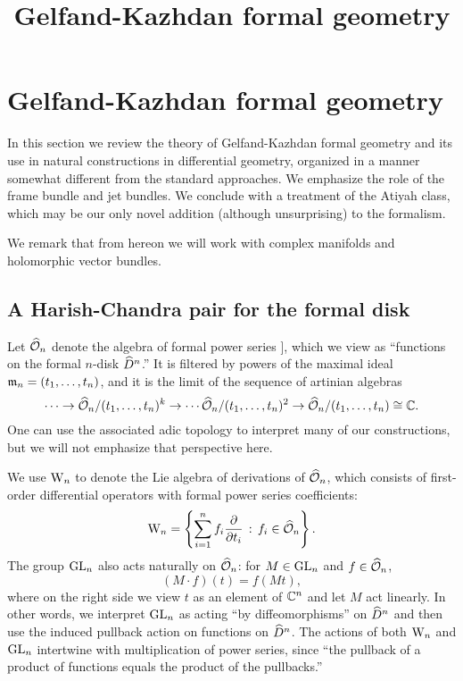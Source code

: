 \documentclass[10pt]{amsart}
\title{Gelfand-Kazhdan formal geometry}
\begin{document}
\maketitle

\section{Gelfand-Kazhdan formal geometry}

In this section we review the theory of Gelfand-Kazhdan formal geometry and its use in natural constructions in differential geometry,
organized in a manner somewhat different from the standard
approaches. We emphasize the role of the frame bundle and jet bundles.
We conclude with a treatment of the Atiyah class, which may be our only novel addition (although unsurprising) to the formalism.

We remark that from hereon we will work with complex manifolds and holomorphic vector bundles.
 
\subsection{A Harish-Chandra pair for the formal disk}

Let $\widehat{\mathcal O}_n$ denote the algebra of formal power series 
\ben
\CC [[ t_1,\ldots,t_n ]],
\een 
which we view as ``functions on the formal $n$-disk $\widehat{D}^n$.'' 
It is filtered by powers of the maximal ideal ${\mathfrak m}_n = (t_1,\ldots,t_n)$, and it is the limit of the sequence of artinian algebras
\[
\cdots \to \widehat{\mathcal O}_n/(t_1,\ldots,t_n)^k \to \cdots \widehat{\mathcal O}_n/(t_1,\ldots,t_n)^2 \to \widehat{\mathcal O}_n/(t_1,\ldots,t_n) \cong \mathbb C.
\] 
One can use the associated adic topology to interpret many of our constructions, but we will not emphasize that perspective here.

We use ${{\rm W}_n}$ to denote the Lie algebra of derivations of $\widehat{\mathcal O}_n$, which consists of first-order differential operators with formal power series coefficients:
\[
{{\rm W}_n} = \left\{ \sum_{i =1 }^n f_i \frac{\partial}{\partial t_i} \,:\, f_i \in \widehat{\mathcal O}_n\right\}.
\]
The group ${\rm GL}_n$ also acts naturally on $\widehat{\mathcal O}_n$: for $M \in {\rm GL}_n$ and $f \in \widehat{\mathcal O}_n$,
\[
(M \cdot f)(t) = f (Mt),
\]
where on the right side we view $t$ as an element of $\mathbb C^n$ and let $M$ act linearly.
In other words, we interpret ${\rm GL}_n$ as acting ``by diffeomorphisms'' on $\widehat{D}^n$ and then use the induced pullback action on functions on $\widehat{D}^n$.
The actions of both ${{\rm W}_n}$ and ${\rm GL}_n$ intertwine with multiplication of power series, 
since ``the pullback of a product of functions equals the product of the pullbacks.''
\end{document}
